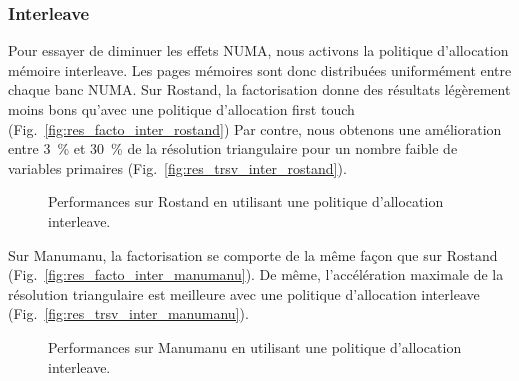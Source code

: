 \subsubsection{Interleave}
Pour essayer de diminuer les effets NUMA, nous activons la politique d'allocation mémoire interleave.
%
Les pages mémoires sont donc distribuées uniformément entre chaque banc NUMA.
%
Sur Rostand, la factorisation donne des résultats légèrement moins bons qu'avec une politique d'allocation first touch (Fig.~\ref{fig:res_facto_inter_rostand})
%
Par contre, nous obtenons une amélioration entre 3~\% et 30~\% de la résolution triangulaire pour un nombre faible de variables primaires (Fig.~\ref{fig:res_trsv_inter_rostand}).



\begin{figure}[!ht]
     \begin{center}
    \end{center}
    \caption{Performances sur Rostand en utilisant une politique d'allocation interleave.}
\end{figure}



Sur Manumanu, la factorisation se comporte de la même façon que sur Rostand (Fig.~\ref{fig:res_facto_inter_manumanu}).
%
De même, l'accélération maximale de la résolution triangulaire est meilleure avec une politique d'allocation interleave (Fig.~\ref{fig:res_trsv_inter_manumanu}).





\begin{figure}[!ht]
     \begin{center}
    \end{center}
    \caption{Performances sur Manumanu en utilisant une politique d'allocation interleave.}
\end{figure}
